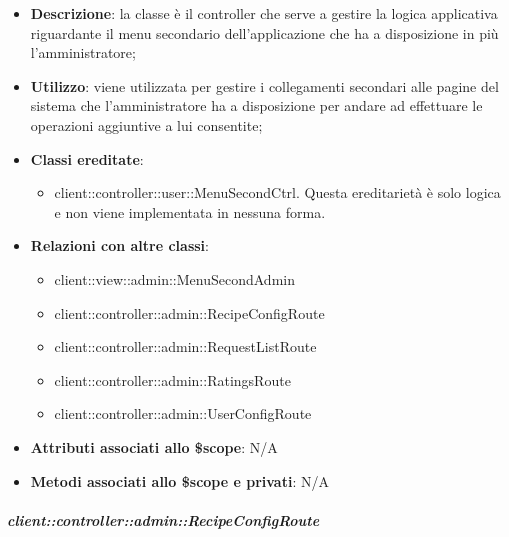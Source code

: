 			\begin{itemize}
				\item \textbf{Descrizione}: la classe è il controller che serve a gestire la logica applicativa riguardante il menu secondario dell'applicazione che ha a disposizione in più l'amministratore;
				\item \textbf{Utilizzo}: viene utilizzata per gestire i collegamenti secondari alle pagine del sistema che l'amministratore ha a disposizione per andare ad effettuare le operazioni aggiuntive a lui consentite;
				\item \textbf{Classi ereditate}:
					\begin{itemize}
						\item client::controller::user::MenuSecondCtrl. Questa ereditarietà è solo logica e non viene implementata in nessuna forma.
					\end{itemize}
				\item \textbf{Relazioni con altre classi}:
					\begin{itemize}
						\item client::view::admin::MenuSecondAdmin
						\item client::controller::admin::RecipeConfigRoute
						\item client::controller::admin::RequestListRoute
						\item client::controller::admin::RatingsRoute
						\item client::controller::admin::UserConfigRoute
					\end{itemize}
				\item \textbf{Attributi associati allo \$scope}: N/A
				\item \textbf{Metodi associati allo \$scope e privati}: N/A
			\end{itemize}

		\subparagraph{client::controller::admin::RecipeConfigRoute} %
		\label{subp:bdsm_app_client_controller_admin_recipeconfigroute}


